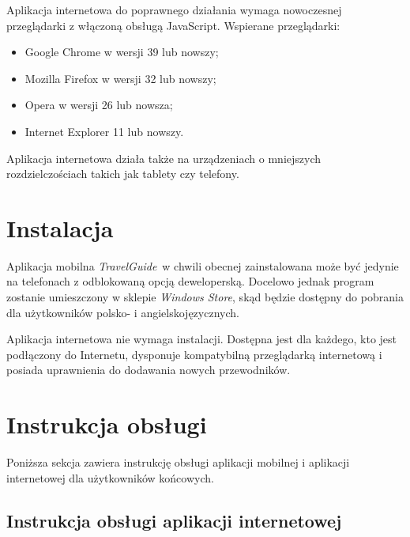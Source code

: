 \documentclass[a4paper]{book}
\newcommand{\appName}{\emph{TravelGuide}}
\begin{document}
		Aplikacja internetowa do poprawnego działania wymaga nowoczesnej przeglądarki z włączoną obsługą JavaScript. Wspierane przeglądarki:
		\begin{itemize}
			\item Google Chrome w wersji 39 lub nowszy;
			\item Mozilla Firefox w wersji 32 lub nowszy;
			\item Opera w wersji 26 lub nowsza;
			\item Internet Explorer 11 lub nowszy.
		\end{itemize}
		
		Aplikacja internetowa działa także na urządzeniach o mniejszych rozdzielczościach takich jak tablety czy telefony.
		
		\section{Instalacja}
		\label{id:sec:instalacja}
		Aplikacja mobilna \appName\ w chwili obecnej zainstalowana może być jedynie na telefonach z odblokowaną opcją deweloperską. Docelowo jednak program zostanie umieszczony w sklepie \emph{Windows Store}, skąd będzie dostępny do pobrania dla użytkowników polsko- i angielskojęzycznych. 
		
		Aplikacja internetowa nie wymaga instalacji. Dostępna jest dla każdego, kto jest podłączony do Internetu, dysponuje kompatybilną przeglądarką internetową i posiada uprawnienia do dodawania nowych przewodników. 
	
	
		\section{Instrukcja obsługi}
		\label{id:sec:instrukcja_obslugi}
		Poniższa sekcja zawiera instrukcję obsługi aplikacji mobilnej i aplikacji internetowej dla użytkowników końcowych. 
		
		\subsection{Instrukcja obsługi aplikacji internetowej}	
		
\end{document}
